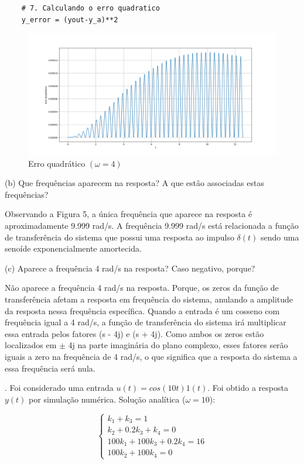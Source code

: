 \documentclass[10pt]{article}
\begin{document}
\begin{lstlisting}
    # 7. Calculando o erro quadratico
    y_error = (yout-y_a)**2
\end{lstlisting}

\newpage

\begin{figure}[h]
    \centering
    \includegraphics[scale=0.4]{erro2.png}
    \caption{Erro quadrático $(\omega = 4)$}
\end{figure}

(b) Que frequências aparecem na resposta? A que estâo associadas estas frequências?

\quad Observando a Figura 5, a única frequência que aparece na resposta é aproximadamente 9.999 rad/s.
A frequência 9.999 rad/s está relacionada a função de transferência do sistema
que possui uma resposta ao impulso $\delta(t)$ sendo uma senoíde exponencialmente amortecida.

(c) Aparece a frequência 4 rad/s na resposta? Caso negativo, porque?

\quad Não aparece a frequência 4 rad/s na resposta. Porque, os zeros da função de transferência afetam a resposta em frequência do sistema,
anulando a amplitude da resposta nessa frequência específica.
Quando a entrada é um cosseno com frequência igual a 4 rad/s,
a função de transferência do sistema irá multiplicar essa entrada pelos fatores (s - 4j) e (s + 4j).
Como ambos os zeros estão localizados em $\pm$ 4j na parte imaginária do plano complexo,
esses fatores serão iguais a zero na frequência de 4 rad/s,
o que significa que a resposta do sistema a essa frequência será nula.

\newpage

. Foi considerado uma entrada $u(t) = cos(10 t) 1(t)$. Foi obtido a resposta $y(t)$ por simulação numérica. Solução analítica ($\omega = 10$):

\begin{equation}
    \left\{
    \begin{array}{l}
        k_1 + k_3 = 1 \\
        k_2 + 0.2k_3 +k_4 = 0 \\
        100k_1 + 100k_3 + 0.2k_4 = 16 \\
        100k_2 + 100k_4 = 0
    \end{array}
    \right. 
\end{equation}
\end{document}

